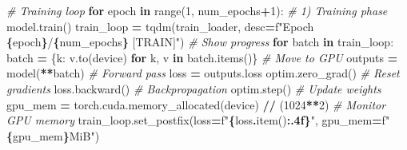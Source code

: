\documentclass[
]{article}
\newenvironment{Shaded}{\begin{snugshade}}{\end{snugshade}}
\newcommand{\BuiltInTok}[1]{#1}
\newcommand{\CommentTok}[1]{\textcolor[rgb]{0.56,0.35,0.01}{\textit{#1}}}
\newcommand{\ControlFlowTok}[1]{\textcolor[rgb]{0.13,0.29,0.53}{\textbf{#1}}}
\newcommand{\DecValTok}[1]{\textcolor[rgb]{0.00,0.00,0.81}{#1}}
\newcommand{\KeywordTok}[1]{\textcolor[rgb]{0.13,0.29,0.53}{\textbf{#1}}}
\newcommand{\NormalTok}[1]{#1}
\newcommand{\OperatorTok}[1]{\textcolor[rgb]{0.81,0.36,0.00}{\textbf{#1}}}
\newcommand{\SpecialCharTok}[1]{\textcolor[rgb]{0.81,0.36,0.00}{\textbf{#1}}}
\newcommand{\SpecialStringTok}[1]{\textcolor[rgb]{0.31,0.60,0.02}{#1}}
\begin{document}
\begin{Shaded}
\begin{Highlighting}[]
\CommentTok{\# Training loop}
\ControlFlowTok{for}\NormalTok{ epoch }\KeywordTok{in} \BuiltInTok{range}\NormalTok{(}\DecValTok{1}\NormalTok{, num\_epochs}\OperatorTok{+}\DecValTok{1}\NormalTok{):}
    \CommentTok{\# 1) Training phase}
\NormalTok{    model.train()}
\NormalTok{    train\_loop }\OperatorTok{=}\NormalTok{ tqdm(train\_loader, desc}\OperatorTok{=}\SpecialStringTok{f"Epoch }\SpecialCharTok{\{}\NormalTok{epoch}\SpecialCharTok{\}}\SpecialStringTok{/}\SpecialCharTok{\{}\NormalTok{num\_epochs}\SpecialCharTok{\}}\SpecialStringTok{ [TRAIN]"}\NormalTok{)  }\CommentTok{\# Show progress}
    \ControlFlowTok{for}\NormalTok{ batch }\KeywordTok{in}\NormalTok{ train\_loop:}
\NormalTok{        batch }\OperatorTok{=}\NormalTok{ \{k: v.to(device) }\ControlFlowTok{for}\NormalTok{ k, v }\KeywordTok{in}\NormalTok{ batch.items()\}  }\CommentTok{\# Move to GPU}
\NormalTok{        outputs }\OperatorTok{=}\NormalTok{ model(}\OperatorTok{**}\NormalTok{batch)  }\CommentTok{\# Forward pass}
\NormalTok{        loss    }\OperatorTok{=}\NormalTok{ outputs.loss}
\NormalTok{        optim.zero\_grad()  }\CommentTok{\# Reset gradients}
\NormalTok{        loss.backward()  }\CommentTok{\# Backpropagation}
\NormalTok{        optim.step()  }\CommentTok{\# Update weights}
\NormalTok{        gpu\_mem }\OperatorTok{=}\NormalTok{ torch.cuda.memory\_allocated(device) }\OperatorTok{//}\NormalTok{ (}\DecValTok{1024}\OperatorTok{**}\DecValTok{2}\NormalTok{)  }\CommentTok{\# Monitor GPU memory}
\NormalTok{        train\_loop.set\_postfix(loss}\OperatorTok{=}\SpecialStringTok{f"}\SpecialCharTok{\{}\NormalTok{loss}\SpecialCharTok{.}\NormalTok{item()}\SpecialCharTok{:.4f\}}\SpecialStringTok{"}\NormalTok{, gpu\_mem}\OperatorTok{=}\SpecialStringTok{f"}\SpecialCharTok{\{}\NormalTok{gpu\_mem}\SpecialCharTok{\}}\SpecialStringTok{MiB"}\NormalTok{)}


\end{Highlighting}
\end{Shaded}
\end{document}
